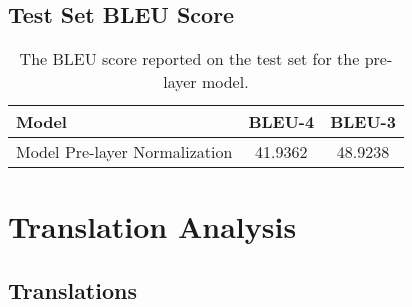 \documentclass[11pt]{article}
\begin{document}
\vspace{2em}

\subsection{Test Set BLEU Score}

\begin{table}[h]
\centering
\begin{tabular}{lcc} \toprule
Model                          & BLEU-4 &  BLEU-3 \\ \midrule
Model Pre-layer Normalization  & 41.9362 & 48.9238 \\
\bottomrule
\end{tabular}
\caption{The BLEU score reported on the test set for the pre-layer model.}
\label{tab:bleu}
\end{table}

\section{Translation Analysis}

\subsection{Translations}
\end{document}
